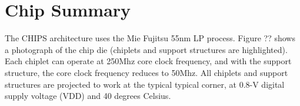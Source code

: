 \documentclass[../main.tex]{subfiles}
\begin{document}
\section{Chip Summary}
\label{sec:Chip-summary}
The CHIPS architecture uses the Mie Fujitsu 55nm LP process. Figure ?? shows a photograph of the chip die (chiplets and support structures are highlighted). Each chiplet can operate at 250Mhz core clock frequency, and with the support structure, the core clock frequency reduces to 50Mhz. All chiplets and support structures are projected to work at the typical typical corner, at 0.8-V digital supply voltage (VDD) and 40 degrees Celsius. 

\end{document}
